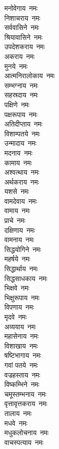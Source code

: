 \begin{multicols}{2}
\begin{flushleft}
मनोवेगाय~नमः\\
निशाचराय~नमः\\
सर्ववासिने~नमः\\
श्रियावासिने~नमः\\
उपदेशकराय~नमः\hfill{}\\
अकराय~नमः\\
मुनये~नमः\\
आत्मनिरालोकाय~नमः\\
सम्भग्नाय~नमः\\
सहस्रदाय~नमः\\
पक्षिणे~नमः\\
पक्षरूपाय~नमः\\
अतिदीप्ताय~नमः\\
विशाम्पतये~नमः\\
उन्मादाय~नमः\hfill{}\\
मदनाय~नमः\\
कामाय~नमः\\
अश्वत्थाय~नमः\\
अर्थकराय~नमः\\
यशसे~नमः\\
वामदेवाय~नमः\\
वामाय~नमः\\
प्राचे~नमः\\
दक्षिणाय~नमः\\
वामनाय~नमः\hfill{}\\
सिद्धयोगिने~नमः\\
महर्षये~नमः\\
सिद्धार्थाय~नमः\\
सिद्धसाधकाय~नमः\\
भिक्षवे~नमः\\
भिक्षुरूपाय~नमः\\
विपणाय~नमः\\
मृदवे~नमः\\
अव्ययाय~नमः\\
महासेनाय~नमः\hfill{}\\
विशाखाय~नमः\\
षष्टिभागाय~नमः\\
गवां पतये~नमः\\
वज्रहस्ताय~नमः\\
विष्कम्भिने~नमः\\
चमूस्तम्भनाय~नमः\\
वृत्तावृत्तकराय~नमः\\
तालाय~नमः\\
मधवे~नमः\\
मधुकलोचनाय~नमः\hfill{}\\
वाचस्पत्याय~नमः\\

\end{flushleft}
\end{multicols}
